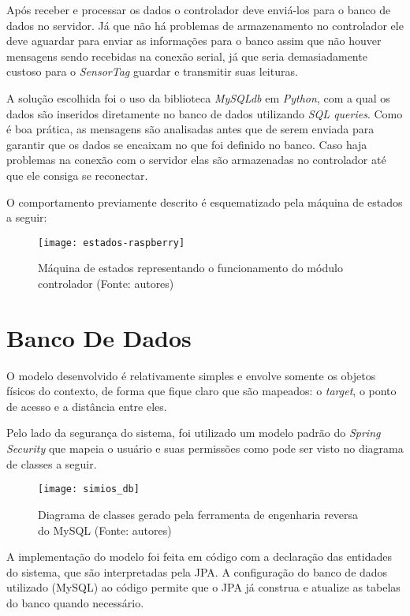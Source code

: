 Após receber e processar os dados o controlador deve enviá-los para o banco de dados no servidor. Já que não há problemas de armazenamento no controlador ele deve aguardar para enviar as informações para o banco assim que não houver mensagens sendo recebidas na conexão serial, já que seria demasiadamente custoso para o \emph{SensorTag} guardar e transmitir suas leituras.

A solução escolhida foi o uso da biblioteca \emph{MySQLdb} em \emph{Python}, com a qual os dados são inseridos diretamente no banco de dados utilizando \emph{SQL queries}. Como é boa prática, as mensagens são analisadas antes que de serem enviada para garantir que os dados se encaixam no que foi definido no banco. Caso haja problemas na conexão com o servidor elas são armazenadas no controlador até que ele consiga se reconectar.

O comportamento previamente descrito é esquematizado pela máquina de estados a seguir:

\begin{figure}[ht]
  \centering
    \texttt{[image: estados-raspberry]}
  \caption{Máquina de estados representando o funcionamento do módulo controlador (Fonte: autores)}
\end{figure}
\FloatBarrier

\section{Banco De Dados}

O modelo desenvolvido é relativamente simples e envolve somente os objetos físicos do contexto, de forma que fique claro que são mapeados: o \emph{target}, o ponto de acesso e a distância entre eles.

Pelo lado da segurança do sistema, foi utilizado um modelo padrão do \emph{Spring Security} que mapeia o usuário e suas permissões como pode ser visto no diagrama de classes a seguir.

\begin{figure}[ht]
  \centering
    \texttt{[image: simios\_db]}
  \caption{Diagrama de classes gerado pela ferramenta de engenharia reversa do MySQL (Fonte: autores)}
\end{figure}
\FloatBarrier

A implementação do modelo foi feita em código com a declaração das entidades do sistema, que são interpretadas pela JPA. A configuração do banco de dados utilizado (MySQL) ao código permite que o JPA já construa e atualize as tabelas do banco quando necessário.

